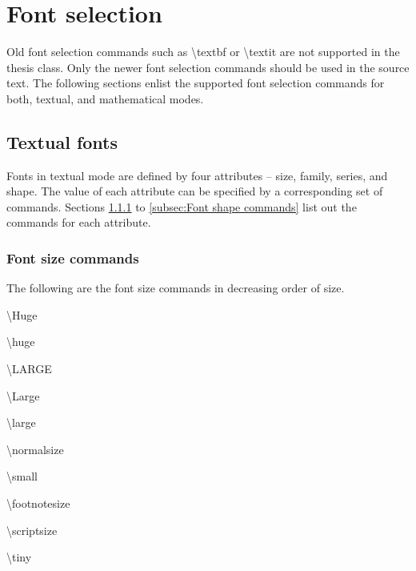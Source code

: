 \documentclass[twoside,openany]{thesis}
\begin{document}
\appendix

\chapter{Font selection}\label{ap:Font selection}

Old font selection commands such as {\ttfamily\textbackslash textbf} or {\ttfamily\textbackslash textit} are not supported in the {\ttfamily thesis} class.
Only the newer font selection commands should be used in the source text.
The following sections enlist the supported font selection commands for both, textual, and mathematical modes.

\section{Textual fonts}\label{sec:Textual fonts}

Fonts in textual mode are defined by four attributes -- size, family, series, and shape.
The value of each attribute can be specified by a corresponding set of commands.
Sections \ref{subsec:Font size commands} to \ref{subsec:Font shape commands} list out the commands for each attribute.

\subsection{Font size commands}\label{subsec:Font size commands}

The following are the font size commands in decreasing order of size.

\begin{listing}

\item   {\ttfamily\textbackslash Huge}

\item   {\ttfamily\textbackslash huge}

\item   {\ttfamily\textbackslash LARGE}

\item   {\ttfamily\textbackslash Large}

\item   {\ttfamily\textbackslash large}

\item   {\ttfamily\textbackslash normalsize}

\item   {\ttfamily\textbackslash small}

\item   {\ttfamily\textbackslash footnotesize}

\item   {\ttfamily\textbackslash scriptsize}

\item   {\ttfamily\textbackslash tiny}

\end{listing}
\end{document}
